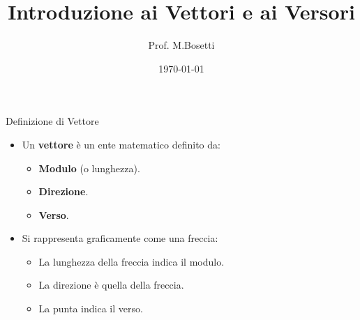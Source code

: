 \documentclass{beamer}
\title{Introduzione ai Vettori e ai Versori}
\author{Prof. M.Bosetti}
\date{\today}
\begin{document}
\begin{frame}
    \titlepage
\end{frame}

\begin{frame}{Definizione di Vettore}
    \begin{itemize}
        \item Un \textbf{vettore} è un ente matematico definito da:
        \begin{itemize}
            \item \textbf{Modulo} (o lunghezza).
            \item \textbf{Direzione}.
            \item \textbf{Verso}.
        \end{itemize}
        \item Si rappresenta graficamente come una freccia:
        \begin{itemize}
            \item La lunghezza della freccia indica il modulo.
            \item La direzione è quella della freccia.
            \item La punta indica il verso.
        \end{itemize}
    \end{itemize}
    \vspace{0.5cm}
    \centering
\end{frame}
\end{document}
